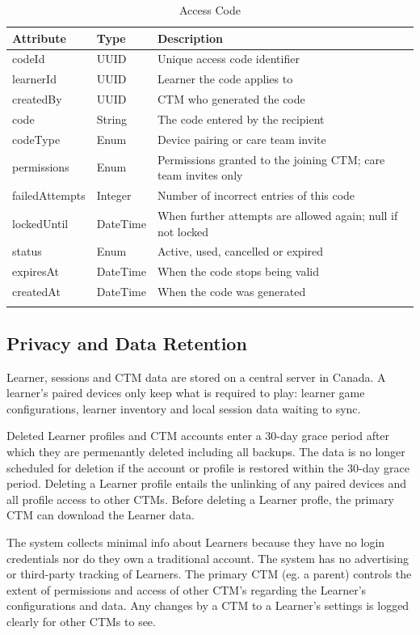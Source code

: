 \documentclass[12pt]{article}
\begin{document}
\begin{longtable}{p{} p{} p{}}
\toprule
Attribute & Type & Description\\
\midrule
codeId & UUID & Unique access code identifier\\
learnerId & UUID & Learner the code applies to\\
createdBy & UUID & CTM who generated the code\\
code & String & The code entered by the recipient\\
codeType & Enum & Device pairing or care team invite\\
permissions & Enum & Permissions granted to the joining CTM; care team invites only\\
failedAttempts & Integer & Number of incorrect entries of this code\\
lockedUntil & DateTime & When further attempts are allowed again; null if not locked\\
status & Enum & Active, used, cancelled or expired\\
expiresAt & DateTime & When the code stops being valid\\
createdAt & DateTime & When the code was generated\\
\bottomrule
\caption{Access Code} \label{tab:AccessCode}
\end{longtable}

\subsection{Privacy and Data Retention}
\label{sec:privacy-data-retention}

Learner, sessions and CTM data are stored on a central server in Canada. A learner's paired devices only keep what is required to play: learner game configurations, learner inventory and local session data waiting to sync.

Deleted Learner profiles and CTM accounts enter a 30-day grace period after which they are permenantly deleted including all backups. The data is no longer scheduled for deletion if the account or profile is restored within the 30-day grace period. Deleting a Learner profile entails the unlinking of any paired devices and all profile access to other CTMs. Before deleting a Learner profle, the primary CTM can download the Learner data.

The system collects minimal info about Learners because they have no login credentials nor do they own a traditional account. The system has no advertising or third-party tracking of Learners. The primary CTM (eg. a parent) controls the extent of permissions and access of other CTM's regarding the Learner's configurations and data. Any changes by a CTM to a Learner's settings is logged clearly for other CTMs to see.
\end{document}

